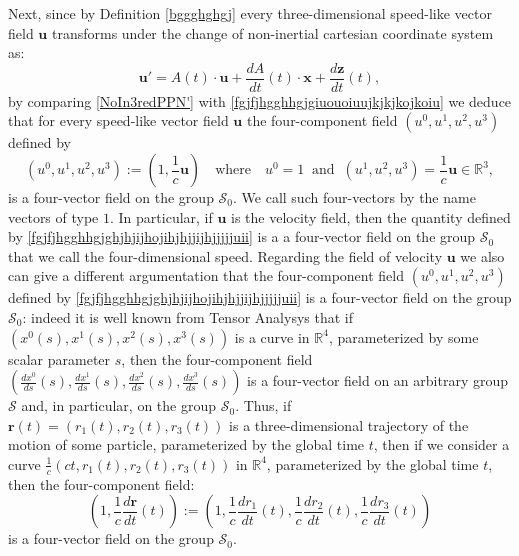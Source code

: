 \documentclass{article}
\theoremstyle{definition}
\theoremstyle{remark}
\renewcommand{\vec}[1]{\mathbf{#1}}
\newcommand{\er}{\eqref}
\newcommand{\er}{\eqref}
\begin{document}
Next, since by Definition \ref{bggghghgj} every three-dimensional
speed-like vector field $\vec u$ transforms under the change of
non-inertial cartesian coordinate system as:
\begin{equation}
\label{NoIn3redPPN'}\vec u'=A(t)\cdot \vec
u+\frac{dA}{dt}\left(t\right)\cdot\vec x+\frac{d \vec
z}{dt}\left(t\right),
\end{equation}
by comparing \er{NoIn3redPPN'} with
\er{fgjfjhgghhgjgiuouoiuujkjkjkojkoiu} we deduce that for every
speed-like vector field $\vec u$ the four-component field
$(u^0,u^1,u^2,u^3)$ defined by
\begin{equation}\label{fgjfjhgghhgjghjhjijhojihjhjjijhjjjjjuii}
(u^0,u^1,u^2,u^3):=\left(1,\frac{1}{c}\vec
u\right)\quad\text{where}\quad
u^0=1\;\;\text{and}\;\;(u^1,u^2,u^3)=\frac{1}{c}\vec
u\in\mathbb{R}^3,
\end{equation}
is a four-vector field on the group $\mathcal{S}_0$. We call such
four-vectors by the name vectors of type $1$. In particular, if
$\vec u$ is the velocity field, then the quantity defined by
\er{fgjfjhgghhgjghjhjijhojihjhjjijhjjjjjuii} is a a four-vector
field on the group $\mathcal{S}_0$ that we call the four-dimensional
speed. Regarding the field of velocity $\vec u$ we also can give a
different argumentation that the four-component field
$(u^0,u^1,u^2,u^3)$ defined by
\er{fgjfjhgghhgjghjhjijhojihjhjjijhjjjjjuii} is a four-vector field
on the group $\mathcal{S}_0$: indeed it is well known from Tensor
Analysys that if $\left(x^0(s),x^1(s),x^2(s),x^3(s)\right)$ is a
curve in $\mathbb{R}^4$, parameterized by some scalar parameter $s$,
then the four-component field
$\left(\frac{dx^0}{ds}(s),\frac{dx^1}{ds}(s),\frac{dx^2}{ds}(s),\frac{dx^3}{ds}(s)\right)$
is a four-vector field on an arbitrary group $\mathcal{S}$ and, in
particular, on the group $\mathcal{S}_0$. Thus, if $\vec
r(t)=\left(r_1(t),r_2(t),r_3(t)\right)$ is a three-dimensional
trajectory of the motion of some particle, parameterized by the
global time $t$, then if we consider a curve
$\frac{1}{c}\left(ct,r_1(t),r_2(t),r_3(t)\right)$ in $\mathbb{R}^4$,
parameterized by the global time $t$, then the four-component field:
\begin{equation}\label{fgjfjhgghhgjghjhjijhojihjhjjijhjjjjjuiijhjhh}
\left(1,\frac{1}{c}\frac{d\vec r}{dt}(t)\right):=
\left(1,\frac{1}{c}\frac{dr_1}{dt}(t),\frac{1}{c}\frac{dr_2}{dt}(t),\frac{1}{c}\frac{dr_3}{dt}(t)\right)
\end{equation}
is a four-vector field on the group $\mathcal{S}_0$.
\end{document}
